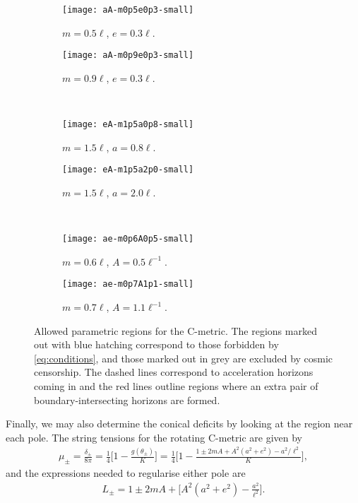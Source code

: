 \documentclass[
twoside,
openright,
frontopenright
]{dmathesis}
\begin{document}
\begin{figure}
  \centering
  \begin{subfigure}[b]{0.45\textwidth}
    \texttt{[image: aA-m0p5e0p3-small]}
    \caption{\label{fig:aA-m0p5e0p3}$m=0.5\ell$, $e=0.3\ell$.}
  \end{subfigure}\qquad
  \begin{subfigure}[b]{0.45\textwidth}
    \texttt{[image: aA-m0p9e0p3-small]}
    \caption{\label{fig:aA-m0p9e0p3}$m=0.9\ell$, $e=0.3\ell$.}
  \end{subfigure} \\
  \begin{subfigure}[b]{0.45\textwidth}
    \texttt{[image: eA-m1p5a0p8-small]}
    \caption{\label{fig:eA-m1p5a0p8}$m=1.5\ell$, $a=0.8\ell$.}
  \end{subfigure}\qquad
  \begin{subfigure}[b]{0.45\textwidth}
    \texttt{[image: eA-m1p5a2p0-small]}
    \caption{\label{fig:eA-m1p5a2p0}$m=1.5\ell$, $a=2.0\ell$.}
  \end{subfigure} \\
  \begin{subfigure}[b]{0.45\textwidth}
    \texttt{[image: ae-m0p6A0p5-small]}
    \caption{\label{fig:ae-m0p6A0p5}$m=0.6\ell$, $A=0.5\ell^{-1}$.}
  \end{subfigure}\qquad
  \begin{subfigure}[b]{0.45\textwidth}
    \texttt{[image: ae-m0p7A1p1-small]}
    \caption{\label{fig:ae-m1p6A1p3}$m=0.7\ell$, $A=1.1\ell^{-1}$.}
  \end{subfigure}
  \caption{\label{fig:param-regions}Allowed parametric regions for the
    C-metric. The regions marked out with blue hatching correspond to those
    forbidden by \cref{eq:conditions}, and those marked out in grey are excluded
    by cosmic censorship. The dashed lines correspond to acceleration horizons
    coming in and the red lines outline regions where an extra pair of
    boundary-intersecting horizons are formed.}
\end{figure}

Finally, we may also determine the conical deficits by looking at the region
near each pole. The string tensions for the rotating C-metric are given by
\begin{align}
\mu_\pm = \frac{\delta_\pm}{8\pi}=\frac14\bigg[1-\frac{g(\theta_\pm)}{K}\bigg] =
  \frac14\bigg[1-\frac{1\pm 2mA + A^2(a^2+e^2)-a^2/\ell^2}{K}\bigg], 
\end{align}
and the expressions needed to regularise either pole are
\begin{align}
L_\pm=1\pm 2mA + \bigg[A^2(a^2+e^2)-\frac{a^2}{\ell^2}\bigg].
\end{align}
\end{document}
